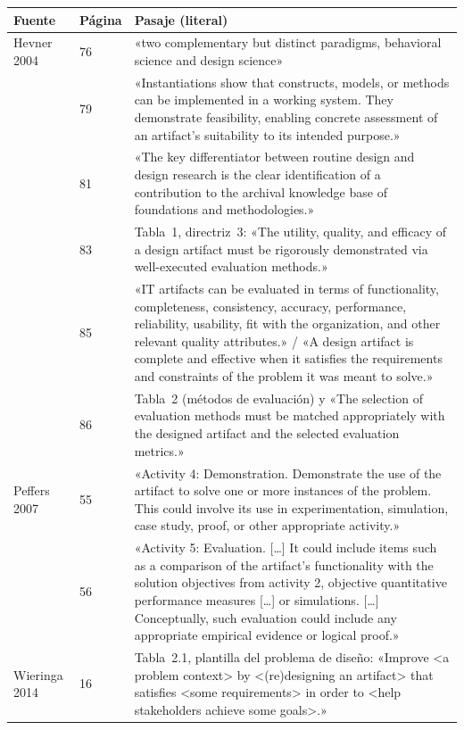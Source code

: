 \documentclass[11pt,a4paper]{article}
\begin{document}
{\small
\begin{longtable}{L{2.6cm}L{1.3cm}L{11.8cm}}
\toprule
\textbf{Fuente} & \textbf{Página} & \textbf{Pasaje (literal)} \\
\midrule
\endhead
Hevner 2004 & 76 & «two complementary but distinct paradigms, behavioral science and design science» \\
 & 79 & «Instantiations show that constructs, models, or methods can be implemented in a working system. They demonstrate feasibility, enabling concrete assessment of an artifact's suitability to its intended purpose.» \\
 & 81 & «The key differentiator between routine design and design research is the clear identification of a contribution to the archival knowledge base of foundations and methodologies.» \\
 & 83 & Tabla~1, directriz~3: «The utility, quality, and efficacy of a design artifact must be rigorously demonstrated via well-executed evaluation methods.» \\
 & 85 & «IT artifacts can be evaluated in terms of functionality, completeness, consistency, accuracy, performance, reliability, usability, fit with the organization, and other relevant quality attributes.» / «A design artifact is complete and effective when it satisfies the requirements and constraints of the problem it was meant to solve.» \\
 & 86 & Tabla~2 (métodos de evaluación) y «The selection of evaluation methods must be matched appropriately with the designed artifact and the selected evaluation metrics.» \\
\midrule
Peffers 2007 & 55 & «Activity 4: Demonstration. Demonstrate the use of the artifact to solve one or more instances of the problem. This could involve its use in experimentation, simulation, case study, proof, or other appropriate activity.» \\
 & 56 & «Activity 5: Evaluation. [\dots] It could include items such as a comparison of the artifact's functionality with the solution objectives from activity 2, objective quantitative performance measures [\dots] or simulations. [\dots] Conceptually, such evaluation could include any appropriate empirical evidence or logical proof.» \\
\midrule
Wieringa 2014 & 16 & Tabla~2.1, plantilla del problema de diseño: «Improve <a problem context> by <(re)designing an artifact> that satisfies <some requirements> in order to <help stakeholders achieve some goals>.» \\

\end{longtable}}
\end{document}
